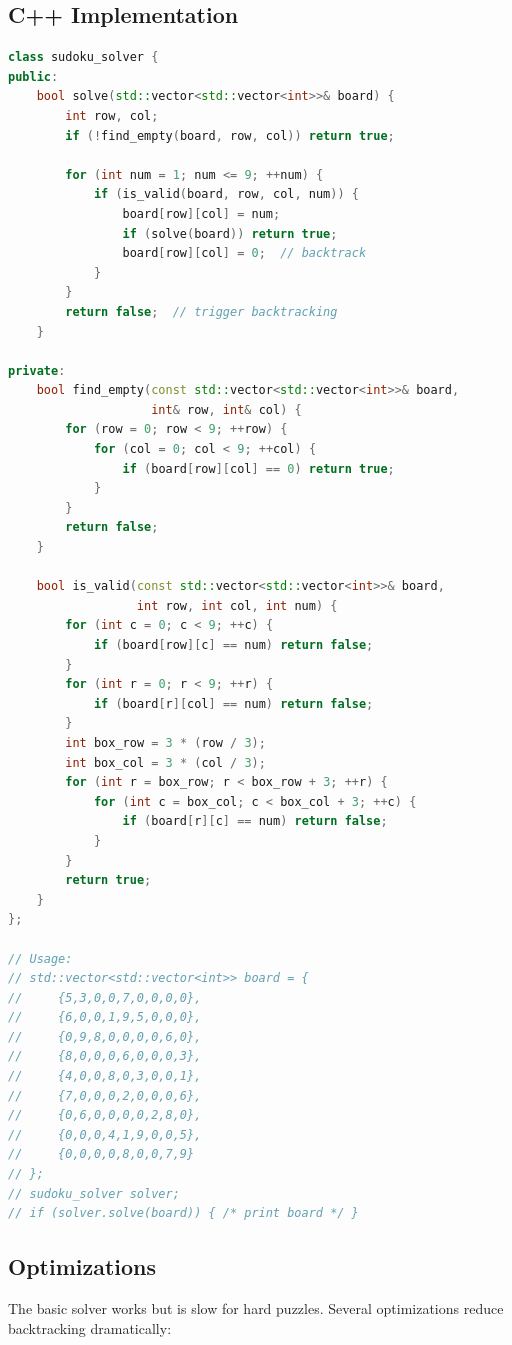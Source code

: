 \subsection{C++ Implementation}

\begin{lstlisting}[language=C++]
class sudoku_solver {
public:
    bool solve(std::vector<std::vector<int>>& board) {
        int row, col;
        if (!find_empty(board, row, col)) return true;

        for (int num = 1; num <= 9; ++num) {
            if (is_valid(board, row, col, num)) {
                board[row][col] = num;
                if (solve(board)) return true;
                board[row][col] = 0;  // backtrack
            }
        }
        return false;  // trigger backtracking
    }

private:
    bool find_empty(const std::vector<std::vector<int>>& board,
                    int& row, int& col) {
        for (row = 0; row < 9; ++row) {
            for (col = 0; col < 9; ++col) {
                if (board[row][col] == 0) return true;
            }
        }
        return false;
    }

    bool is_valid(const std::vector<std::vector<int>>& board,
                  int row, int col, int num) {
        for (int c = 0; c < 9; ++c) {
            if (board[row][c] == num) return false;
        }
        for (int r = 0; r < 9; ++r) {
            if (board[r][col] == num) return false;
        }
        int box_row = 3 * (row / 3);
        int box_col = 3 * (col / 3);
        for (int r = box_row; r < box_row + 3; ++r) {
            for (int c = box_col; c < box_col + 3; ++c) {
                if (board[r][c] == num) return false;
            }
        }
        return true;
    }
};

// Usage:
// std::vector<std::vector<int>> board = {
//     {5,3,0,0,7,0,0,0,0},
//     {6,0,0,1,9,5,0,0,0},
//     {0,9,8,0,0,0,0,6,0},
//     {8,0,0,0,6,0,0,0,3},
//     {4,0,0,8,0,3,0,0,1},
//     {7,0,0,0,2,0,0,0,6},
//     {0,6,0,0,0,0,2,8,0},
//     {0,0,0,4,1,9,0,0,5},
//     {0,0,0,0,8,0,0,7,9}
// };
// sudoku_solver solver;
// if (solver.solve(board)) { /* print board */ }
\end{lstlisting}

\subsection{Optimizations}

The basic solver works but is slow for hard puzzles. Several optimizations reduce backtracking dramatically:

